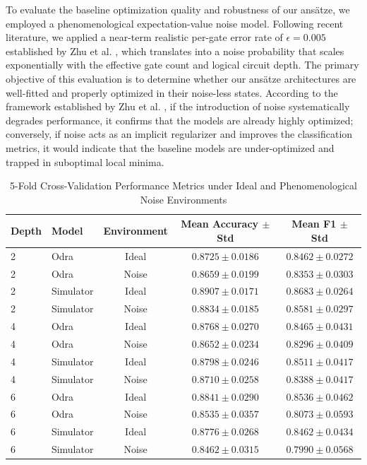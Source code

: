 \documentclass[11pt]{article}
\begin{document}
To evaluate the baseline optimization quality and robustness of our ans\"atze, we employed a phenomenological expectation-value noise model. Following recent literature, we applied a near-term realistic per-gate error rate of $\epsilon = 0.005$ established by Zhu et al. \cite{zhu2026}, which translates into a noise probability that scales exponentially with the effective gate count and logical circuit depth. The primary objective of this evaluation is to determine whether our ans\"atze architectures are well-fitted and properly optimized in their noise-less states. According to the framework established by Zhu et al. \cite{zhu2026}, if the introduction of noise systematically degrades performance, it confirms that the models are already highly optimized; conversely, if noise acts as an implicit regularizer and improves the classification metrics, it would indicate that the baseline models are under-optimized and trapped in suboptimal local minima.

\begin{table}[htbp]
    \centering
    \caption{5-Fold Cross-Validation Performance Metrics under Ideal and Phenomenological Noise Environments}
    \label{tab:noise_cv}
    \renewcommand{\arraystretch}{1.2}
    \begin{tabular}{llccc}
        \hline
        \textbf{Depth} & \textbf{Model} & \textbf{Environment} & \textbf{Mean Accuracy $\pm$ Std} & \textbf{Mean F1 $\pm$ Std} \\ \hline
        2 & Odra & Ideal & $0.8725 \pm 0.0186$ & $0.8462 \pm 0.0272$ \\
        2 & Odra & Noise & $0.8659 \pm 0.0199$ & $0.8353 \pm 0.0303$ \\
        2 & Simulator & Ideal & $0.8907 \pm 0.0171$ & $0.8683 \pm 0.0264$ \\
        2 & Simulator & Noise & $0.8834 \pm 0.0185$ & $0.8581 \pm 0.0297$ \\ \hline
        4 & Odra & Ideal & $0.8768 \pm 0.0270$ & $0.8465 \pm 0.0431$ \\
        4 & Odra & Noise & $0.8652 \pm 0.0234$ & $0.8296 \pm 0.0409$ \\
        4 & Simulator & Ideal & $0.8798 \pm 0.0246$ & $0.8511 \pm 0.0417$ \\
        4 & Simulator & Noise & $0.8710 \pm 0.0258$ & $0.8388 \pm 0.0417$ \\ \hline
        6 & Odra & Ideal & $0.8841 \pm 0.0290$ & $0.8536 \pm 0.0462$ \\
        6 & Odra & Noise & $0.8535 \pm 0.0357$ & $0.8073 \pm 0.0593$ \\
        6 & Simulator & Ideal & $0.8776 \pm 0.0268$ & $0.8462 \pm 0.0434$ \\
        6 & Simulator & Noise & $0.8462 \pm 0.0315$ & $0.7990 \pm 0.0568$ \\ \hline
    \end{tabular}
\end{table}
\end{document}
